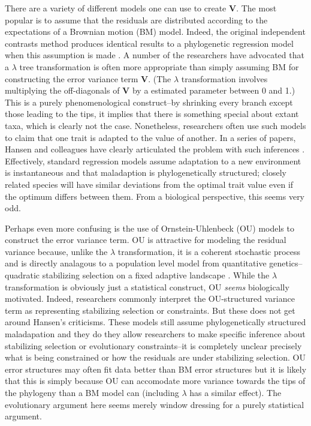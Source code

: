 There are a variety of different models one can use to create $\mathbf{V}$. The most popular is to assume that the residuals are distributed according to the expectations of a Brownian motion (BM) model. Indeed, the original independent contrasts method \citep{Felsenstein1985} produces identical results to a phylogenetic regression model when this assumption is made \citep{Blomberg2012}. A number of the researchers have advocated that a $\lambda$ tree transformation \citep{Pagel1999, Freckleton2002, Freckleton2011} is often more appropriate than simply assuming BM for constructing the error variance term $\mathbf{V}$. (The $\lambda$ transformation involves multiplying the off-diagonals of $\mathbf{V}$ by a estimated parameter between 0 and 1.) This is a purely phenomenological construct--by shrinking every branch except those leading to the tips, it implies that there is something special about extant taxa, which is clearly not the case. Nonetheless, researchers often use such models to claim that one trait is adapted to the value of another. In a series of papers, Hansen and colleagues have clearly articulated the problem with such inferences \citep{HansenOrzack2005, Hansen2008, Labra2009, Hansen2012SysBio}. Effectively, standard regression models assume adaptation to a new environment is instantaneous and that maladaption is phylogenetically structured; closely related species will have similar deviations from the optimal trait value even if the optimum differs between them. From a biological perspective, this seems very odd.

Perhaps even more confusing is the use of Ornstein-Uhlenbeck (OU) models to construct the error variance term. OU is attractive for modeling the residual variance because, unlike the $\lambda$ transformation, it is a coherent stochastic process and is directly analagous to a population level model from quantitative genetics--quadratic stabilizing selection on a fixed adaptive landscape \citep{Lande1976, HansenMartins1996}. While the $\lambda$ transformation is obviously just a statistical construct, OU \emph{seems} biologically motivated. Indeed, researchers commonly interpret the OU-structured variance term as representing stabilizing selection or constraints. But these does not get around Hansen's criticisms. These models still assume phylogenetically structured maladapation and they do they allow researchers to make specific inference about stabilizing selection or evolutionary constraints--it is completely unclear precisely what is being constrained or how the residuals are under stabilizing selection. OU error structures may often fit data better than BM error structures but it is likely that this is simply because OU can accomodate more variance towards the tips of the phylogeny than a BM model can (including $\lambda$ has a similar effect). The evolutionary argument here seems merely window dressing for a purely statistical argument. 

